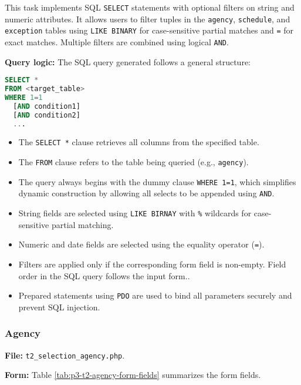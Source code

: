 \documentclass[a4paper, 12pt]{article}
\begin{document}
This task implements SQL \texttt{SELECT} statements with optional filters on string and numeric attributes. It allows users to filter tuples in the \texttt{agency}, \texttt{schedule}, and \texttt{exception} tables using \texttt{LIKE BINARY} for case-sensitive partial matches and \texttt{=} for exact matches. Multiple filters are combined using logical \texttt{AND}.

\textbf{Query logic:} The SQL query generated follows a general structure:

\begin{lstlisting}[language=SQL]
SELECT * 
FROM <target_table>
WHERE 1=1
  [AND condition1]
  [AND condition2]
  ...
\end{lstlisting}



\begin{itemize}
    \item The \texttt{SELECT *} clause retrieves all columns from the specified table.
    \item The \texttt{FROM} clause refers to the table being queried (e.g., \texttt{agency}).
    \item The query always begins with the dummy clause \texttt{WHERE 1=1}, which simplifies dynamic construction by allowing all selects to be appended using \texttt{AND}.
    \item String fields are selected using \texttt{LIKE BIRNAY} with \texttt{\%} wildcards for case-sensitive partial matching.
    \item Numeric and date fields are selected using the equality operator (\texttt{=}).
    \item Filters are applied only if the corresponding form field is non-empty. Field order in the SQL query follows the input form..
    \item Prepared statements using \texttt{PDO} are used to bind all parameters securely and prevent SQL injection.
\end{itemize}


\subsubsection{Agency}

\textbf{File:} \texttt{t2\_selection\_agency.php}.

\textbf{Form:} Table \ref{tab:p3-t2-agency-form-fields} summarizes the form fields.
\end{document}
